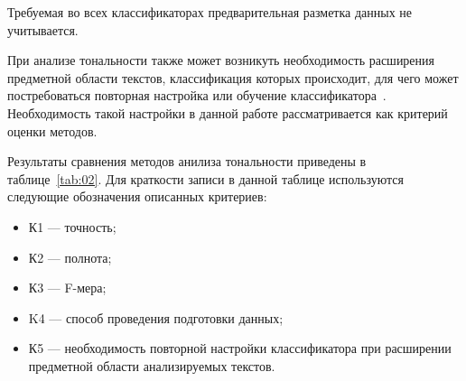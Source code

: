 Требуемая во всех классификаторах предварительная разметка данных не
учитывается.

При анализе тональности также может возникуть необходимость расширения
предметной области текстов, классификация которых происходит, для чего может
постребоваться повторная настройка или обучение
классификатора~\cite{article21}.  Необходимость такой настройки в данной
работе рассматривается как критерий оценки методов.

Результаты сравнения методов анилиза тональности приведены в
таблице~\ref{tab:02}. Для краткости записи в данной таблице используются
следующие обозначения описанных критериев:
\begin{itemize}
    \item К1 --- точность;
    \item К2 --- полнота;
    \item К3 --- F-мера;
    \item K4 --- способ проведения подготовки данных;
    \item К5 --- необходимость повторной настройки классификатора при расширении
        предметной области анализируемых текстов.
\end{itemize}

